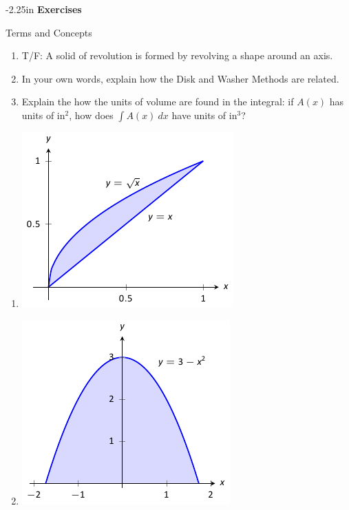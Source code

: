 \begin{adjustwidth*}{}{-2.25in}
\textbf{{\large Exercises}}
\setlength{\columnsep}{25pt}
\begin{multicols*}{2}
\noindent Terms and Concepts \small
\begin{enumerate}[1)]
\item T/F: A solid of revolution is formed by revolving a shape around an axis.
\item In your own words, explain how the Disk and Washer Methods are related.
\item Explain the how the units of volume are found in the integral: if $A(x)$ has units of in$^2$, how does $\int A(x)\ dx$ have units of in$^3$?
\end{enumerate} 

 \small


\begin{enumerate}[1),resume]
\item \begin{minipage}{\linewidth}\centering\includegraphics{figures/fig07_02_ex_04}\end{minipage}

\item \begin{minipage}{\linewidth}\centering\includegraphics{figures/fig07_02_ex_05}\end{minipage}


\end{enumerate}
\end{multicols*}
\end{adjustwidth*}
